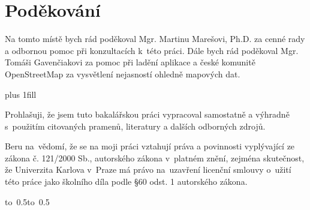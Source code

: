 \documentclass[12pt,a4paper]{report}
\let\openright=\clearpage
\begin{document}
\newpage



\openright

\noindent
\chapter*{Poděkování}
Na tomto místě bych rád poděkoval Mgr. Martinu Marešovi, Ph.D. za cenné rady a
odbornou pomoc při konzultacích k~této práci. Dále bych rád poděkoval Mgr.
Tomáši Gavenčiakovi za pomoc při ladění aplikace a české komunitě OpenStreetMap
za vysvětlení nejasností ohledně mapových dat.

\newpage


\vglue 0pt plus 1fill

\noindent
Prohlašuji, že jsem tuto bakalářskou práci vypracoval samostatně a výhradně
s~použitím citovaných pramenů, literatury a dalších odborných zdrojů.

\medskip\noindent
Beru na~vědomí, že se na moji práci vztahují práva a povinnosti vyplývající
ze zákona č. 121/2000 Sb., autorského zákona v~platném znění, zejména skutečnost,
že Univerzita Karlova v~Praze má právo na~uzavření licenční smlouvy o~užití této
práce jako školního díla podle §60 odst. 1 autorského zákona.

\vspace{10mm}

\hbox{\hbox to 0.5\hbox to 0.5}

\vspace{20mm}
\newpage

\end{document}

